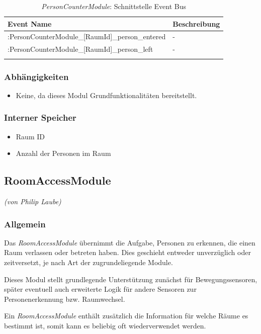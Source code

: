\begin{longtabu} to 
		\hline
		\textbf{Event Name}													& \textbf{Beschreibung} \\
	\hline
	\endhead
		\hline [DeviceId]:PersonCounterModule\_[RaumId]\_person\_entered	& - \\ 
		\hline [DeviceId]:PersonCounterModule\_[RaumId]\_person\_left		& - \\
		\hline
	\caption{\emph{PersonCounterModule}: Schnittstelle Event Bus}
\end{longtabu}

\subsubsection{Abhängigkeiten}
\begin{itemize}
	\item Keine, da dieses Modul Grundfunktionalitäten bereitstellt.
\end{itemize}

\subsubsection{Interner Speicher}
\begin{itemize}
	\item Raum ID
	\item Anzahl der Personen im Raum
\end{itemize}


\newpage
\subsection{RoomAccessModule}
\emph{(von Philip Laube)}

\subsubsection{Allgemein}
Das \emph{RoomAccessModule} übernimmt die Aufgabe, Personen zu erkennen, die einen Raum verlassen oder betreten haben. Dies geschieht entweder unverzüglich oder zeitversetzt, je nach Art der zugrundeliegende Module.

Dieses Modul stellt grundlegende Unterstützung zunächst für Bewegungssensoren, später eventuell auch erweiterte Logik für andere Sensoren zur Personenerkennung bzw. Raumwechsel.

Ein \emph{RoomAccessModule} enthält zusätzlich die Information für welche Räume es bestimmt ist, somit kann es beliebig oft wiederverwendet werden.

